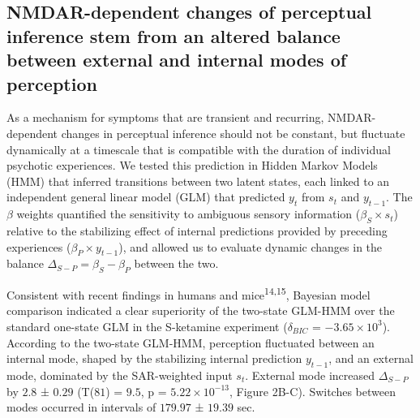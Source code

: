 \documentclass[
]{article}
\begin{document}
\subsection{NMDAR-dependent changes of perceptual inference stem from an
altered balance between external and internal modes of
perception}\label{nmdar-dependent-changes-of-perceptual-inference-stem-from-an-altered-balance-between-external-and-internal-modes-of-perception}

As a mechanism for symptoms that are transient and recurring,
NMDAR-dependent changes in perceptual inference should not be constant,
but fluctuate dynamically at a timescale that is compatible with the
duration of individual psychotic experiences. We tested this prediction
in Hidden Markov Models (HMM) that inferred transitions between two
latent states, each linked to an independent general linear model (GLM)
that predicted \(y_t\) from \(s_t\) and \(y_{t-1}\). The \(\beta\)
weights quantified the sensitivity to ambiguous sensory information
(\(\beta_S \times s_t\)) relative to the stabilizing effect of internal
predictions provided by preceding experiences
(\(\beta_{P} \times y_{t-1}\)), and allowed us to evaluate dynamic
changes in the balance \(\Delta_{S-P} = \beta_S - \beta_P\) between the
two.

Consistent with recent findings in humans and
mice\textsuperscript{14,15}, Bayesian model comparison indicated a clear
superiority of the two-state GLM-HMM over the standard one-state GLM in
the S-ketamine experiment (\(\delta_{BIC}\) =
\(\ensuremath{-3.65\times 10^{3}}\)). According to the two-state
GLM-HMM, perception fluctuated between an internal mode, shaped by the
stabilizing internal prediction \(y_{t-1}\), and an external mode,
dominated by the SAR-weighted input \(s_t\). External mode increased
\(\Delta_{S-P}\) by \(2.8\) ± \(0.29\) (T(\(81\)) = \(9.5\), p =
\(\ensuremath{5.22\times 10^{-13}}\), Figure 2B-C). Switches between
modes occurred in intervals of \(179.97\) ± \(19.39\) sec.~
\end{document}

